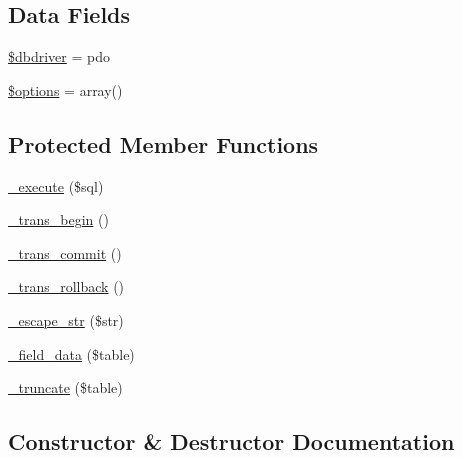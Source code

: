 \subsection*{Data Fields}
\begin{DoxyCompactItemize}
\item 
\mbox{\hyperlink{class_c_i___d_b__pdo__driver_a0cde2a16322a023d040aa7f725877597}{\$dbdriver}} = \textquotesingle{}pdo\textquotesingle{}
\item 
\mbox{\hyperlink{class_c_i___d_b__pdo__driver_a011800c63ece4cbbfa77136a20607023}{\$options}} = array()
\end{DoxyCompactItemize}
\subsection*{Protected Member Functions}
\begin{DoxyCompactItemize}
\item 
\mbox{\hyperlink{class_c_i___d_b__pdo__driver_a114ab675d89bf8324a41785fb475e86d}{\+\_\+execute}} (\$sql)
\item 
\mbox{\hyperlink{class_c_i___d_b__pdo__driver_ac81ac882c1d54347d810199a15856aac}{\+\_\+trans\+\_\+begin}} ()
\item 
\mbox{\hyperlink{class_c_i___d_b__pdo__driver_a6fe7f373e0b11cfae23a5f41c0b35dda}{\+\_\+trans\+\_\+commit}} ()
\item 
\mbox{\hyperlink{class_c_i___d_b__pdo__driver_ad49a116b0776c26b53114c9093fd102a}{\+\_\+trans\+\_\+rollback}} ()
\item 
\mbox{\hyperlink{class_c_i___d_b__pdo__driver_af8ef0237bfcdb19215b63fff769e7a55}{\+\_\+escape\+\_\+str}} (\$str)
\item 
\mbox{\hyperlink{class_c_i___d_b__pdo__driver_a95247d9671893adc3444cb184ad32ea1}{\+\_\+field\+\_\+data}} (\$table)
\item 
\mbox{\hyperlink{class_c_i___d_b__pdo__driver_aa029600528fc1ce660a23ff4b4667f95}{\+\_\+truncate}} (\$table)
\end{DoxyCompactItemize}


\subsection{Constructor \& Destructor Documentation}
\mbox{\label{class_c_i___d_b__pdo__driver_a9162320adff1a1a4afd7f2372f753a3e}} 
